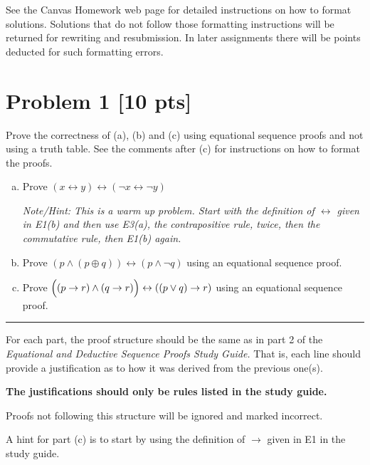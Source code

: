 \documentclass[12pt]{article}
\begin{document}
	See the Canvas Homework web page for detailed instructions on how to format
	solutions. Solutions that do not follow those formatting instructions will be returned
	for rewriting and resubmission. In later assignments there will be points
	deducted for such formatting errors.

	\newpage

	\section*{\textbf{Problem 1} [10 pts]}

	Prove the correctness of (a), (b) and (c) using equational sequence proofs and
	not using a truth table. See the comments after (c) for instructions on how to
	format the proofs.

	\begin{enumerate}[(a)]
		\item Prove $(x\leftrightarrow y) \leftrightarrow (\neg x \leftrightarrow \neg
			y)$

			{\em \small Note/Hint: This is a warm up problem. Start with the definition of $\leftrightarrow$ given in E1(b) and then use E3(a), the contrapositive rule, twice, then the commutative rule, then E1(b) again. }

		\item Prove $(p \wedge (p \oplus q))\leftrightarrow (p \wedge \neg q)$ using
			an equational sequence proof.

		\item Prove $\Bigl( ( p \rightarrow r) \wedge (q \rightarrow r)\Bigr) \leftrightarrow
			\left( (p \vee q)\rightarrow r \right)$ using an equational sequence proof.
	\end{enumerate}

	\hrule

	\bigskip

	For each part, the proof structure should be the same as in part 2 of the
	{\em Equational and Deductive Sequence Proofs Study Guide.} That is, each line
	should provide a justification as to how it was derived from the previous one(s).

	{\bf The justifications should only be rules listed in the study guide.}

	Proofs not following this structure will be ignored and marked incorrect.

	A hint for part (c) is to start by using the definition of $\rightarrow$ given
	in E1 in the study guide.

	\bigskip
\end{document}
